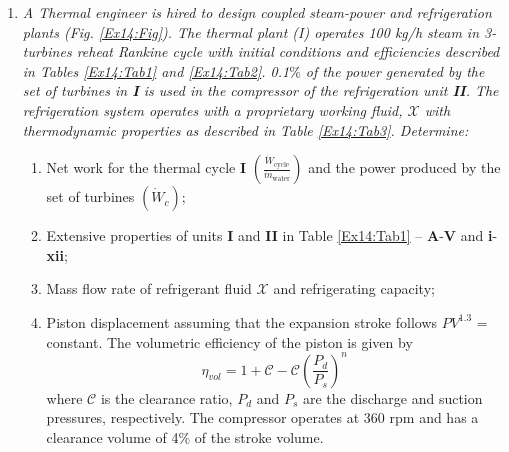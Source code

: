 \begin{enumerate}
\pagebreak

\item \label{Ex14} {\it A Thermal engineer is hired to design coupled steam-power and refrigeration plants (Fig. \ref{Ex14:Fig}). The thermal plant (I) operates 100 kg/h steam in 3-turbines reheat Rankine cycle with initial conditions and efficiencies described in Tables \ref{Ex14:Tab1} and \ref{Ex14:Tab2}. 0.1$\%$ of the power generated by the set of turbines in {\bf I} is used in the compressor of the refrigeration unit {\bf II}. The refrigeration system operates with a proprietary working fluid, $\mathcal{X}$ with thermodynamic properties as described in Table \ref{Ex14:Tab3}. Determine:
\begin{enumerate}
\item Net work for the thermal cycle {\bf I} $\left(\displaystyle\frac{\dot{W}_{\text{cycle}}}{\dot{m}_{\text{water}}}\right)$ and the power produced by the set of turbines $\left(\dot{W}_{c}\right)$;
\item Extensive properties of units {\bf I} and {\bf II} in Table \ref{Ex14:Tab1} -- {\bf A}-{\bf V} and {\bf i}-{\bf xii};
\item Mass flow rate of refrigerant fluid $\mathcal{X}$ and refrigerating capacity;
\item Piston displacement assuming that the expansion stroke follows $PV^{1.3}$ = constant. The volumetric efficiency of the piston is given by
\begin{displaymath}
\eta_{vol}=1 + \mathcal{C} - \mathcal{C} \left(\frac{P_{d}}{P_{s}}\right)^{n}
\end{displaymath}
where $\mathcal{C}$ is the clearance ratio, $P_{d}$ and $P_{s}$ are the discharge and suction pressures, respectively. The compressor operates at 360 rpm and has a clearance volume of 4$\%$ of the stroke volume.
\end{enumerate}

}


\end{enumerate}
